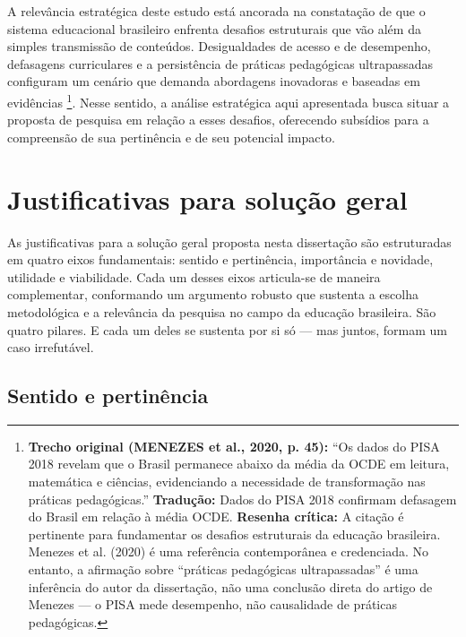 A relevância estratégica deste estudo está ancorada na constatação de que o sistema educacional brasileiro enfrenta desafios estruturais que vão além da simples transmissão de conteúdos. Desigualdades de acesso e de desempenho, defasagens curriculares e a persistência de práticas pedagógicas ultrapassadas configuram um cenário que demanda abordagens inovadoras e baseadas em evidências \cite{MENEZES2020}\footnote{\textbf{Trecho original (MENEZES et al., 2020, p. 45):} ``Os dados do PISA 2018 revelam que o Brasil permanece abaixo da média da OCDE em leitura, matemática e ciências, evidenciando a necessidade de transformação nas práticas pedagógicas.'' \textbf{Tradução:} Dados do PISA 2018 confirmam defasagem do Brasil em relação à média OCDE. \textbf{Resenha crítica:} A citação é pertinente para fundamentar os desafios estruturais da educação brasileira. Menezes et al. (2020) é uma referência contemporânea e credenciada. No entanto, a afirmação sobre ``práticas pedagógicas ultrapassadas'' é uma inferência do autor da dissertação, não uma conclusão direta do artigo de Menezes — o PISA mede desempenho, não causalidade de práticas pedagógicas.}. Nesse sentido, a análise estratégica aqui apresentada busca situar a proposta de pesquisa em relação a esses desafios, oferecendo subsídios para a compreensão de sua pertinência e de seu potencial impacto.

\section{Justificativas para solução geral}
\label{sec:justificativa_geral}

As justificativas para a solução geral proposta nesta dissertação são estruturadas em quatro eixos fundamentais: sentido e pertinência, importância e novidade, utilidade e viabilidade. Cada um desses eixos articula-se de maneira complementar, conformando um argumento robusto que sustenta a escolha metodológica e a relevância da pesquisa no campo da educação brasileira. São quatro pilares. E cada um deles se sustenta por si só — mas juntos, formam um caso irrefutável.

\subsection{Sentido e pertinência}
\label{subsec:jg_sentido}

